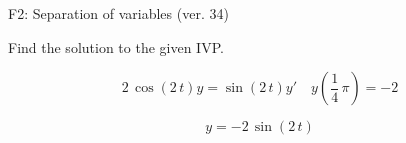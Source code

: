 \begin{exercise}
  \begin{exerciseTitle}F2: Separation of variables (ver. 34)\end{exerciseTitle}
  \begin{exerciseStatement}
    
Find the solution to the given IVP.

    
\[2 \, \cos\left(2 \, t\right) y= \sin\left(2 \, t\right) y'\hspace{1em} y\left( \frac{1}{4} \, \pi \right)= -2\]

  \end{exerciseStatement}
  \begin{exerciseAnswer}
    
\[y= -2 \, \sin\left(2 \, t\right)\]

  \end{exerciseAnswer}
\end{exercise}